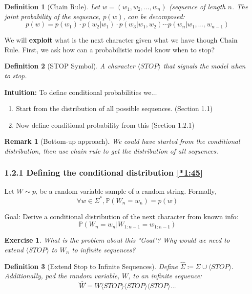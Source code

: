 \documentclass[12pt, twoside]{article}
\theoremstyle{spaceddefn}
\newtheorem{definition}{Definition}[section]
\newtheorem{remark}{Remark}[section]
\newtheorem{exercise}{Exercise}[section]
\begin{document}
\begin{definition}[Chain Rule] \label{def:1.2}
Let $w = (w_1, w_2, \dots, w_n)$ (sequence of length $n$. The joint probability of the sequence, $p(w)$, can be decomposed:
\[ p(w) = p(w_1) \cdot p(w_2 | w_1) \cdot p(w_3 | w_1, w_2) \cdots p(w_n | w_1, \dots, w_{n-1}) \]
\end{definition}

We will \textbf{exploit} what is the next character given what we have though Chain Rule. First, we ask how can a probabilistic model know when to stop?



\begin{definition}[STOP Symbol]
A character $\langle STOP \rangle$ that signals the model when to stop.
\end{definition}

\textbf{Intuition:} To define conditional probabilities we...
\begin{enumerate}
    \item Start from the distribution of all possible sequences. (Section 1.1)
    \item Now define conditional probability from this (Section 1.2.1)
\end{enumerate}

\begin{remark} [Bottom-up approach]
    We could have started from the conditional distribution, then use chain rule to get the distribution of all sequences.
\end{remark}

\subsubsection*{1.2.1 Defining the conditional distribution \href{https://youtu.be/DR8bQPoRlX8?si=YfpqZSf6sS3tfome&t=105}{[*1:45]}}

Let $W\sim p$, be a random variable sample of a random string. Formally, $$\forall w \in\Sigma^*, \mathbb{P}(W_n = w_n)=p(w)$$

Goal: Derive a conditional distribution of the next character from known info:
$$\mathbb{P}(W_n=w_n|W_{1:n-1}=w_{1:n-1})$$

\begin{exercise} \label{ex:1.3}
 What is the problem about this "Goal"? Why would we need to extend $\langle STOP \rangle$ to $W_n$ to infinite sequences?
\end{exercise}

\begin{definition}[Extend Stop to Infinite Sequences]
    Define $\hat{\Sigma} \coloneqq \Sigma \cup \langle STOP \rangle$. Additionally, pad the random variable, $W$, to an infinite sequence:
    $$\hat{W}=W\langle STOP \rangle\langle STOP \rangle\langle STOP \rangle...$$
\end{definition}
\end{document}
